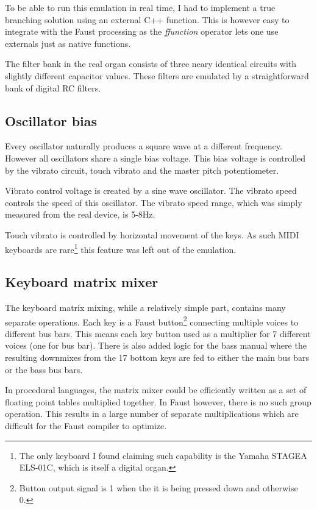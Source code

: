 \documentclass[11pt,a4paper]{article}
\begin{document}
To be able to run this emulation in real time, I had to implement a true branching solution using an external C++ function. This is however easy to integrate with the Faust processing as the \emph{ffunction} operator lets one use externals just as native functions.

The filter bank in the real organ consists of three neary identical circuits with slightly different capacitor values. These filters are emulated by a straightforward bank of digital RC filters\cite{rc-filter}.%

\subsection{Oscillator bias}
\label{section:oscillator-bias}

Every oscillator naturally produces a square wave at a different frequency. However all oscillators share a single bias voltage. This bias voltage is controlled by the vibrato circuit, touch vibrato and the master pitch potentiometer.

Vibrato control voltage is created by a sine wave oscillator. The vibrato speed controls the speed of this oscillator. The vibrato speed range, which was simply measured from the real device, is 5-8Hz.

Touch vibrato is controlled by horizontal movement of the keys. As such MIDI keyboards are rare\footnote{The only keyboard I found claiming such capability is the Yamaha STAGEA ELS-01C, which is itself a digital organ.} this feature was left out of the emulation.


\subsection{Keyboard matrix mixer}

The keyboard matrix mixing, while a relatively simple part, contains many separate operations. Each key is a Faust button\footnote{Button output signal is 1 when the it is being pressed down and otherwise 0.} connecting multiple voices to different bus bars. This means each key button used as a multiplier for 7 different voices (one for bus bar). There is also added logic for the bass manual where the resulting downmixes from the 17 bottom keys are fed to either the main bus bars or the bass bus bars.

In procedural languages, the matrix mixer could be efficiently written as a set of floating point tables multiplied together. In Faust however, there is no such group operation. This results in a large number of separate multiplications which are difficult for the Faust compiler to optimize.
\end{document}
